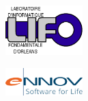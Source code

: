 {\begin{sffamily}
\vspace{3cm}

\begin{minipage}{3cm}
\includegraphics[width=3cm]{logos/logoLIFO.png} 
\end{minipage}
\hfill
\begin{minipage}{3cm}
\includegraphics[width=3cm]{logos/logoEnnov.png} 
\end{minipage}
\hfill

\end{sffamily}
}	 
\setlength{\voffset}{0pt}